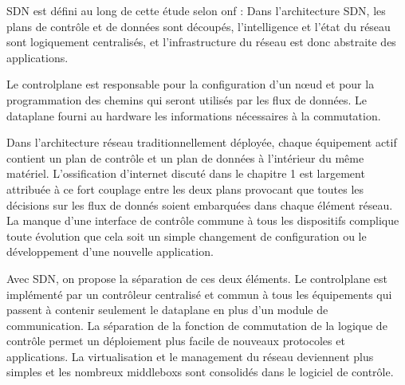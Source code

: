 SDN est défini au long de cette étude  selon \gls{onf} : Dans l'architecture SDN, les plans de contrôle et de données sont découpés, l'intelligence et l'état du réseau sont logiquement centralisés, et l'infrastructure du réseau est donc abstraite des applications. \cite{SDNNewNormONFExecutiveSummary}



Le \gls{controlplane} est responsable pour la configuration d'un nœud et pour la programmation des chemins qui seront utilisés par les flux de données. Le \gls{dataplane} fourni au hardware les informations nécessaires à la commutation. \cite{ImplementationChallengesForSDNBackground}



Dans l'architecture réseau traditionnellement déployée, chaque équipement actif contient un plan de contrôle et un plan de données à l'intérieur du même matériel. L'ossification d'internet discuté dans le chapitre 1 est largement attribuée à ce fort couplage entre les deux plans provocant que toutes les décisions sur les flux de donnés soient embarquées dans chaque élément réseau. La manque d'une interface de contrôle commune à tous les dispositifs complique toute évolution que cela soit un simple changement de configuration ou le développement d'une nouvelle application. \cite{SurveySDNArchi}




Avec SDN, on propose la séparation de ces deux éléments. Le \gls{controlplane} est implémenté par un contrôleur centralisé et commun à tous les équipements qui passent à contenir seulement le \gls{dataplane} en plus d'un module de communication.  La séparation de la fonction de commutation de la logique de contrôle permet un déploiement plus facile de nouveaux protocoles et applications. La virtualisation et le management du réseau deviennent plus simples et les nombreux \glspl{middlebox} sont consolidés dans le logiciel de contrôle. \cite{SurveySDNArchi} \cite{SDNNewNormONFExecutiveSummary}

